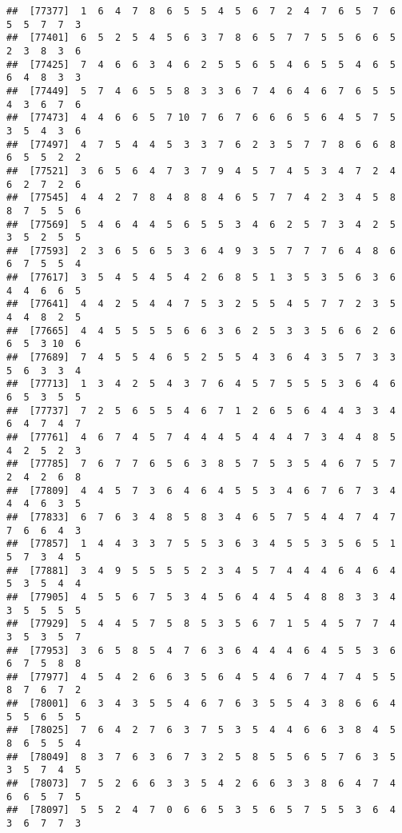\documentclass[
]{book}
\begin{document}
\begin{verbatim}
##  [77377]  1  6  4  7  8  6  5  5  4  5  6  7  2  4  7  6  5  7  6  5  5  7  7  3
##  [77401]  6  5  2  5  4  5  6  3  7  8  6  5  7  7  5  5  6  6  5  2  3  8  3  6
##  [77425]  7  4  6  6  3  4  6  2  5  5  6  5  4  6  5  5  4  6  5  6  4  8  3  3
##  [77449]  5  7  4  6  5  5  8  3  3  6  7  4  6  4  6  7  6  5  5  4  3  6  7  6
##  [77473]  4  4  6  6  5  7 10  7  6  7  6  6  6  5  6  4  5  7  5  3  5  4  3  6
##  [77497]  4  7  5  4  4  5  3  3  7  6  2  3  5  7  7  8  6  6  8  6  5  5  2  2
##  [77521]  3  6  5  6  4  7  3  7  9  4  5  7  4  5  3  4  7  2  4  6  2  7  2  6
##  [77545]  4  4  2  7  8  4  8  8  4  6  5  7  7  4  2  3  4  5  8  8  7  5  5  6
##  [77569]  5  4  6  4  4  5  6  5  5  3  4  6  2  5  7  3  4  2  5  3  5  2  5  5
##  [77593]  2  3  6  5  6  5  3  6  4  9  3  5  7  7  7  6  4  8  6  6  7  5  5  4
##  [77617]  3  5  4  5  4  5  4  2  6  8  5  1  3  5  3  5  6  3  6  4  4  6  6  5
##  [77641]  4  4  2  5  4  4  7  5  3  2  5  5  4  5  7  7  2  3  5  4  4  8  2  5
##  [77665]  4  4  5  5  5  5  6  6  3  6  2  5  3  3  5  6  6  2  6  6  5  3 10  6
##  [77689]  7  4  5  5  4  6  5  2  5  5  4  3  6  4  3  5  7  3  3  5  6  3  3  4
##  [77713]  1  3  4  2  5  4  3  7  6  4  5  7  5  5  5  3  6  4  6  6  5  3  5  5
##  [77737]  7  2  5  6  5  5  4  6  7  1  2  6  5  6  4  4  3  3  4  6  4  7  4  7
##  [77761]  4  6  7  4  5  7  4  4  4  5  4  4  4  7  3  4  4  8  5  4  2  5  2  3
##  [77785]  7  6  7  7  6  5  6  3  8  5  7  5  3  5  4  6  7  5  7  2  4  2  6  8
##  [77809]  4  4  5  7  3  6  4  6  4  5  5  3  4  6  7  6  7  3  4  4  4  6  3  5
##  [77833]  6  7  6  3  4  8  5  8  3  4  6  5  7  5  4  4  7  4  7  7  6  6  4  3
##  [77857]  1  4  4  3  3  7  5  5  3  6  3  4  5  5  3  5  6  5  1  5  7  3  4  5
##  [77881]  3  4  9  5  5  5  5  2  3  4  5  7  4  4  4  6  4  6  4  5  3  5  4  4
##  [77905]  4  5  5  6  7  5  3  4  5  6  4  4  5  4  8  8  3  3  4  3  5  5  5  5
##  [77929]  5  4  4  5  7  5  8  5  3  5  6  7  1  5  4  5  7  7  4  3  5  3  5  7
##  [77953]  3  6  5  8  5  4  7  6  3  6  4  4  4  6  4  5  5  3  6  6  7  5  8  8
##  [77977]  4  5  4  2  6  6  3  5  6  4  5  4  6  7  4  7  4  5  5  8  7  6  7  2
##  [78001]  6  3  4  3  5  5  4  6  7  6  3  5  5  4  3  8  6  6  4  5  5  6  5  5
##  [78025]  7  6  4  2  7  6  3  7  5  3  5  4  4  6  6  3  8  4  5  8  6  5  5  4
##  [78049]  8  3  7  6  3  6  7  3  2  5  8  5  5  6  5  7  6  3  5  3  5  7  4  5
##  [78073]  7  5  2  6  6  3  3  5  4  2  6  6  3  3  8  6  4  7  4  6  6  5  7  5
##  [78097]  5  5  2  4  7  0  6  6  5  3  5  6  5  7  5  5  3  6  4  3  6  7  7  3

\end{verbatim}
\end{document}
